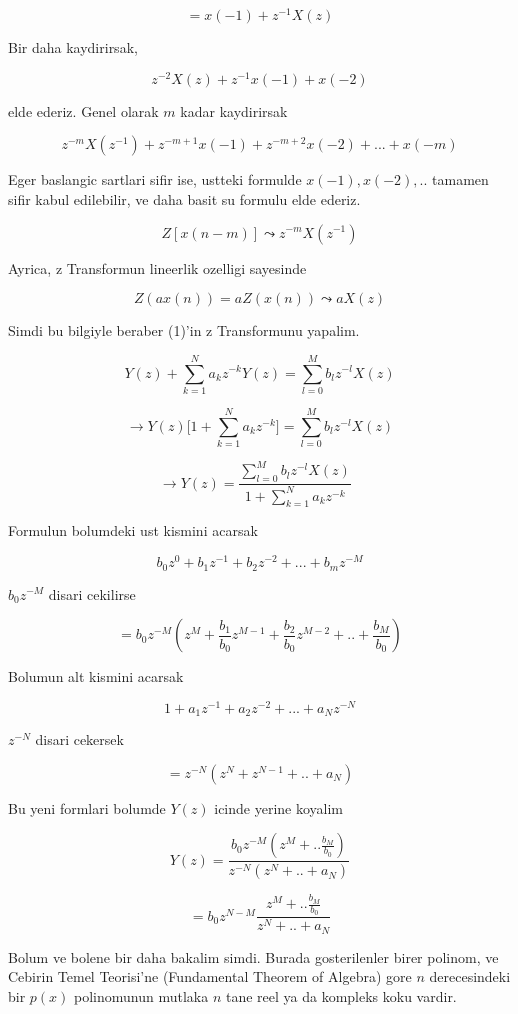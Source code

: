 \documentclass[12pt,fleqn]{article}\usepackage{../common}
\begin{document}
$$ = x(-1) + z^{-1}X(z)$$

Bir daha kaydirirsak, 

$$ z^{-2}X(z) + z^{-1}x(-1) + x(-2) $$

elde ederiz. Genel olarak $m$ kadar kaydirirsak

$$ z^{-m}X(z^{-1}) + z^{-m+1}x(-1) + z^{-m+2}x(-2) + ... + x(-m) $$

Eger baslangic sartlari sifir ise, ustteki formulde $x(-1),x(-2),..$
tamamen sifir kabul edilebilir, ve daha basit su formulu elde ederiz. 

$$ Z[x(n-m)] \leadsto z^{-m}X(z^{-1})$$

Ayrica, z Transformun lineerlik ozelligi sayesinde 

$$ Z(ax(n)) = aZ(x(n)) \leadsto aX(z) $$

Simdi bu bilgiyle beraber (1)'in z Transformunu yapalim. 

$$ Y(z) + \sum_{k=1}^Na_kz^{-k}Y(z) = \sum_{l=0}^M b_l z^{-l}X(z)  $$

$$ \to Y(z) \bigg[ 1 + \sum_{k=1}^Na_kz^{-k} \bigg] = \sum_{l=0}^M b_l z^{-l}X(z)  $$

$$ \to Y(z)  = \frac{\sum_{l=0}^M b_l z^{-l}X(z) }{ 1 +
  \sum_{k=1}^Na_kz^{-k}} 
\ \ \ \label{5}
$$

Formulun bolumdeki ust kismini acarsak 

$$ b_0z^0 + b_1z^{-1} + b_2z^{-2} + ... + b_mz^{-M} $$

$b_0z^{-M}$ disari cekilirse

$$ = b_0z^{-M}(z^M + \frac{b_1}{b_0}z^{M-1} +  \frac{b_2}{b_0}z^{M-2} +
.. + 
 \frac{b_M}{b_0})
$$

Bolumun alt kismini acarsak 

$$ 1 + a_1z^{-1} + a_2z^{-2} + ... + a_Nz^{-N} $$

$z^{-N}$ disari cekersek 

$$ = z^{-N} ( z^{N} + z^{N-1} + .. + a_N) $$

Bu yeni formlari bolumde $Y(z)$ icinde yerine koyalim

$$ Y(z) = 
\frac{b_0z^{-M}(z^M + ..\frac{b_M}{b_0})}{z^{-N} ( z^{N} + .. + a_N)} 
$$

$$ = b_0 z^{N - M} \frac{z^M + ..\frac{b_M}{b_0}}{z^{N} + .. + a_N }$$

Bolum ve bolene bir daha bakalim simdi. Burada gosterilenler birer polinom,
ve Cebirin Temel Teorisi'ne (Fundamental Theorem of Algebra) gore $n$
derecesindeki bir $p(x)$ polinomunun mutlaka $n$ tane reel ya da kompleks
koku vardir. 
\end{document}
